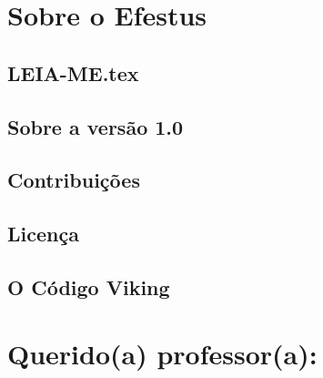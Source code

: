 %	
%	
\pagebreak
\color{black}

	\chapter{\sffamily Sobre o Efestus}
	
\section{\sffamily LEIA-ME.tex}



\section{\sffamily Sobre a versão 1.0}


\section{\sffamily Contribuições}


\section{\sffamily Licença}


\section{\sffamily O Código Viking}


		\chapter{\sffamily Querido(a) professor(a):}

%		





